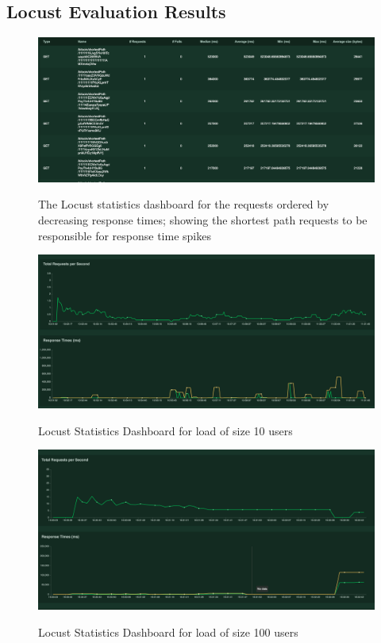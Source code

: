 \appendix
\begin{appendices}
\chapter{Locust Evaluation Results}
\begin{figure}[h!]
  \centering
  \includegraphics[width = 15cm]{./figures/10-users-original-culprit}\\[0.5cm]
  \caption{The Locust statistics dashboard for the requests ordered by decreasing response times; showing the shortest path requests to be responsible for response time spikes}
  \label{fig:10-users-original-culprit}
\end{figure}

\begin{figure}
  \centering
  \includegraphics[width = 22cm]{./figures/10-users-original}\\[0.5cm] 
  \caption{Locust Statistics Dashboard for load of size 10 users}
  \label{fig:10-users-original}
\end{figure}

\begin{figure}
  \centering
  \includegraphics[width = 22cm]{./figures/100-users-performance-trace}\\[0.5cm] 
  \caption{Locust Statistics Dashboard for load of size 100 users}
  \label{fig:100-users-stats-dashboard}
\end{figure}


\end{appendices}
